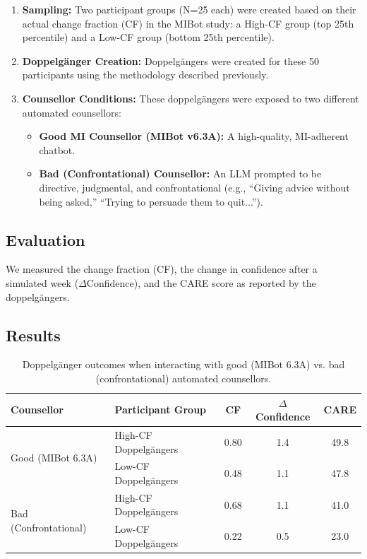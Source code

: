\begin{enumerate}
    \item \textbf{Sampling:} Two participant groups (N=25 each) were created based on their actual change fraction (CF) in the MIBot study: a High-CF group (top 25th percentile) and a Low-CF group (bottom 25th percentile).

    \item \textbf{Doppelgänger Creation:} Doppelgängers were created for these 50 participants using the methodology described previously.
    
    \item \textbf{Counsellor Conditions:} These doppelgängers were exposed to two different automated counsellors:
    \begin{itemize}
        \item \textbf{Good MI Counsellor (MIBot v6.3A):} A high-quality, MI-adherent chatbot.
        
        \item \textbf{Bad (Confrontational) Counsellor:} An LLM prompted to be directive, judgmental, and confrontational (e.g., ``Giving advice without being asked,'' ``Trying to persuade them to quit...'').
    \end{itemize}
\end{enumerate}

\subsection{Evaluation}
We measured the change fraction (CF), the change in confidence after a simulated week ($\Delta$Confidence), and the CARE score as reported by the doppelgängers.

\subsection{Results}

\begin{table}[ht!]
\centering
\begin{tabular}{@{}llccc@{}}
\toprule
\textbf{Counsellor} & \textbf{Participant Group} & \textbf{CF} & \textbf{$\Delta$Confidence} & \textbf{CARE} \\ \midrule
\multirow{2}{*}{Good (MIBot 6.3A)} & High-CF Doppelgängers & 0.80 & 1.4 & 49.8 \\
& Low-CF Doppelgängers & 0.48 & 1.1 & 47.8 \\ \midrule
\multirow{2}{*}{Bad (Confrontational)} & High-CF Doppelgängers & 0.68 & 1.1 & 41.0 \\
& Low-CF Doppelgängers & 0.22 & 0.5 & 23.0 \\ \bottomrule
\end{tabular}
\caption[Effect of counselling quality on doppelgängers' motivational language.]{Doppelgänger outcomes when interacting with good (MIBot 6.3A) vs. bad (confrontational) automated counsellors.}
\label{tab:good-vs-bad-counselling}
\end{table}

